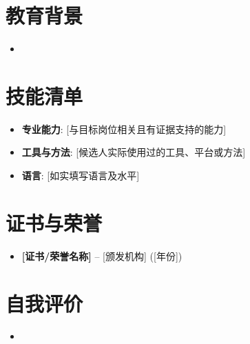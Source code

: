 \documentclass[11pt,a4paper,sans]{moderncv}
\begin{document}

\section{教育背景}
\vspace{1pt}
\begin{itemize}
\item{}
\end{itemize}


\section{技能清单}
\vspace{1pt}
\begin{itemize}
\item \textbf{专业能力}: [与目标岗位相关且有证据支持的能力]
\item \textbf{工具与方法}: [候选人实际使用过的工具、平台或方法]
\item \textbf{语言}: [如实填写语言及水平]
\end{itemize}


\section{证书与荣誉}
\vspace{1pt}
\begin{itemize}
\item{\textbf{[证书/荣誉名称]} -- [颁发机构] ([年份])}
\end{itemize}


\section{自我评价}
\vspace{1pt}
\begin{itemize}
\item [1-2 句话总结工作风格、职业素养或核心驱动力]
\end{itemize}
\end{document}
